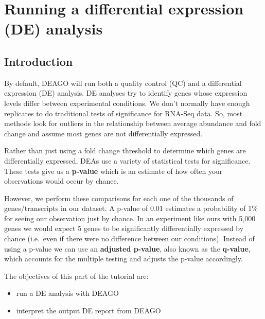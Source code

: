\documentclass[11pt]{article}
\providecommand{\tightlist}{%
      \setlength{\itemsep}{0pt}\setlength{\parskip}{0pt}}
\begin{document}
\newpage






    \hypertarget{running-a-differential-expression-de-analysis}{%
\section{Running a differential expression (DE)
analysis}\label{running-a-differential-expression-de-analysis}}

    \hypertarget{introduction}{%
\subsection{Introduction}\label{introduction}}

By default, DEAGO will run both a quality control (QC) and a
differential expression (DE) analysis. DE analyses try to identify genes
whose expression levels differ between experimental conditions. We don't
normally have enough replicates to do traditional tests of significance
for RNA-Seq data. So, most methods look for outliers in the relationship
between average abundance and fold change and assume most genes are not
differentially expressed.

Rather than just using a fold change threshold to determine which genes
are differentially expressed, DEAs use a variety of statistical tests
for significance. These tests give us a \textbf{p-value} which is an
estimate of how often your observations would occur by chance.

However, we perform these comparisons for each one of the thousands of
genes/transcripts in our dataset. A p-value of 0.01 estimates a
probability of 1\% for seeing our observation just by chance. In an
experiment like ours with 5,000 genes we would expect 5 genes to be
significantly differentially expressed by chance (i.e.~even if there
were no difference between our conditions). Instead of using a p-value
we can use an \textbf{adjusted p-value}, also known as the
\textbf{q-value}, which accounts for the multiple testing and adjusts
the p-value accordingly.

The objectives of this part of the tutorial are:

\begin{itemize}
\tightlist
\item
  run a DE analysis with DEAGO
\item
  interpret the output DE report from DEAGO
\end{itemize}
\end{document}
